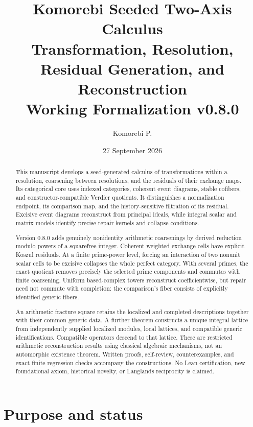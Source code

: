 \documentclass[11pt]{article}
\title{\textbf{Komorebi Seeded Two-Axis Calculus}\\
\large Transformation, Resolution, Residual Generation, and Reconstruction\\[0.4em]
\normalsize Working Formalization v0.8.0}
\author{Komorebi P.}
\date{27 September 2026}
\theoremstyle{definition}
\theoremstyle{remark}
\begin{document}
\maketitle

\begin{abstract}
This manuscript develops a seed-generated calculus of transformations within a resolution, coarsening between resolutions, and the residuals of their exchange maps. Its categorical core uses indexed categories, coherent event diagrams, stable cofibers, and constructor-compatible Verdier quotients. It distinguishes a normalization endpoint, its comparison map, and the history-sensitive filtration of its residual. Excisive event diagrams reconstruct from principal ideals, while integral scalar and matrix models identify precise repair kernels and collapse conditions.

Version 0.8.0 adds genuinely nonidentity arithmetic coarsenings by derived reduction modulo powers of a squarefree integer. Coherent weighted exchange cells have explicit Koszul residuals. At a finite prime-power level, forcing an interaction of two nonunit scalar cells to be excisive collapses the whole perfect category. With several primes, the exact quotient removes precisely the selected prime components and commutes with finite coarsening. Uniform based-complex towers reconstruct coefficientwise, but repair need not commute with completion: the comparison's fiber consists of explicitly identified generic fibers.

An arithmetic fracture square retains the localized and completed descriptions together with their common generic data. A further theorem constructs a unique integral lattice from independently supplied localized modules, local lattices, and compatible generic identifications. Compatible operators descend to that lattice. These are restricted arithmetic reconstruction results using classical algebraic mechanisms, not an automorphic existence theorem. Written proofs, self-review, counterexamples, and exact finite regression checks accompany the constructions. No Lean certification, new foundational axiom, historical novelty, or Langlands reciprocity is claimed.
\end{abstract}
\newpage

\tableofcontents
\newpage

\section{Purpose and status}
\end{document}
